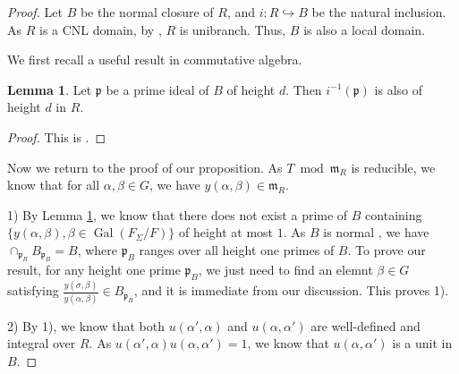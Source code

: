 \documentclass[12pt]{amsart}
\theoremstyle{plain}
\theoremstyle{definition}
\newtheorem{lemma}[thm]{Lemma}
\theoremstyle{remark}
\begin{document}
\begin{proof} 
    Let $B$ be the normal closure of $R$, and $i: R \hookrightarrow B$ be the natural inclusion. As $R$ is a CNL domain, by \cite[Lemma 15.106.3]{stacks-project}, $R$ is unibranch. Thus, $B$ is also a local domain.
    
     We first recall a useful result in commutative algebra.
	
	\begin{lemma}\label{commutative algebra}
		 Let $\mathfrak{p}$ be a prime ideal of $B$ of height $d$. Then $i^{-1}(\mathfrak{p})$ is also of height $d$ in $R$.
	\end{lemma}
	
	\begin{proof}
		This is \cite[Proposition 9.2]{eisenbud2013commutative}.
		
		
	\end{proof}
	
	Now we return to the proof of our proposition. As $T~\operatorname{mod}~\mathfrak{m}_R$ is reducible, we know that for all $\alpha, \beta \in G$, we have $y(\alpha, \beta) \in \mathfrak{m}_R$.
	
	1) By Lemma \ref{commutative algebra}, we know that there does not exist a prime of $B$ containing $\{y(\alpha, \beta), \beta \in \operatorname{Gal}(F_\Sigma/F)\}$ of height at most $1$. 
	As $B$ is normal , we have $\cap_{\mathfrak{p}_{B}} B_{\mathfrak{p}_{B}}=B $, where $ \mathfrak{p}_{B}$ ranges over all height one primes of $B$. To prove our result, for any height one prime $ \mathfrak{p}_{B}$, we just need to find an elemnt $\beta \in G$ satisfying $\frac{y(\sigma, \beta)}{y(\alpha, \beta)} \in B_{\mathfrak{p}_{B}}$, and it is immediate from our discussion. This proves 1).
	
	2) By 1), we know that both $u(\alpha', \alpha)$ and $u(\alpha, \alpha')$ are well-defined and integral over $R$. As $u(\alpha', \alpha)u(\alpha, \alpha')=1 $, we know that $u(\alpha, \alpha')$ is a unit in $B$. 
\end{proof}
\end{document}
